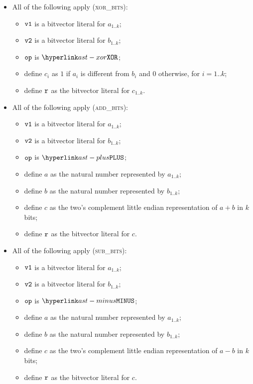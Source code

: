 \begin{itemize}
  \item All of the following apply (\textsc{xor\_bits}):
  \begin{itemize}
    \item $\texttt{v1}$ is a bitvector literal for $a_{1..k}$;
    \item $\texttt{v2}$ is a bitvector literal for $b_{1..k}$;
    \item $\texttt{op}$ is $\XOR$;
    \item define $c_i$ as $1$ if $a_i$ is different from $b_i$ and $0$ otherwise, for $i=1..k$;
    \item define $\texttt{r}$ as the bitvector literal for $c_{1..k}$.
  \end{itemize}

  \item All of the following apply (\textsc{add\_bits}):
  \begin{itemize}
    \item $\texttt{v1}$ is a bitvector literal for $a_{1..k}$;
    \item $\texttt{v2}$ is a bitvector literal for $b_{1..k}$;
    \item $\texttt{op}$ is $\PLUS$;
    \item define $a$ as the natural number represented by $a_{1..k}$;
    \item define $b$ as the natural number represented by $b_{1..k}$;
    \item define $c$ as the two's complement little endian representation of $a+b$ in $k$ bits;
    \item define $\texttt{r}$ as the bitvector literal for $c$.
  \end{itemize}

  \item All of the following apply (\textsc{sub\_bits}):
  \begin{itemize}
    \item $\texttt{v1}$ is a bitvector literal for $a_{1..k}$;
    \item $\texttt{v2}$ is a bitvector literal for $b_{1..k}$;
    \item $\texttt{op}$ is $\MINUS$;
    \item define $a$ as the natural number represented by $a_{1..k}$;
    \item define $b$ as the natural number represented by $b_{1..k}$;
    \item define $c$ as the two's complement little endian representation of $a-b$ in $k$ bits;
    \item define $\texttt{r}$ as the bitvector literal for $c$.
  \end{itemize}


\end{itemize}
